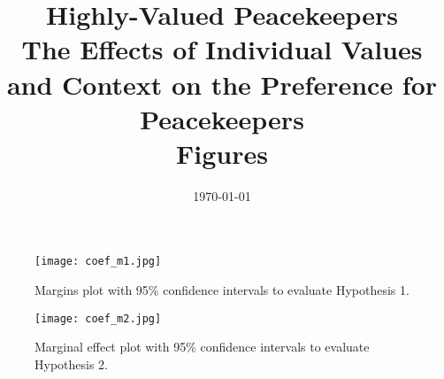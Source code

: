 \documentclass[12pt]{article}
\title{Highly-Valued Peacekeepers \\
\large The Effects of Individual Values and Context on the Preference for Peacekeepers \\
\textbf{Figures}}
\date{\today}
\begin{document}
 
\begin{titlingpage}
\maketitle
\end{titlingpage}

\clearpage 
\begin{figure}[h!]
\begin{centering}
\texttt{[image: coef\_m1.jpg]}
\caption{\small Margins plot with 95\% confidence intervals to evaluate Hypothesis 1. }
\label{M1_fig}
\end{centering}
\end{figure}

\clearpage

\begin{figure}[h!]
\begin{centering}
\texttt{[image: coef\_m2.jpg]}
\caption{\small Marginal effect plot with 95\% confidence intervals to evaluate Hypothesis 2.}
\label{figure 2}
\end{centering}
\end{figure}
\end{document}
